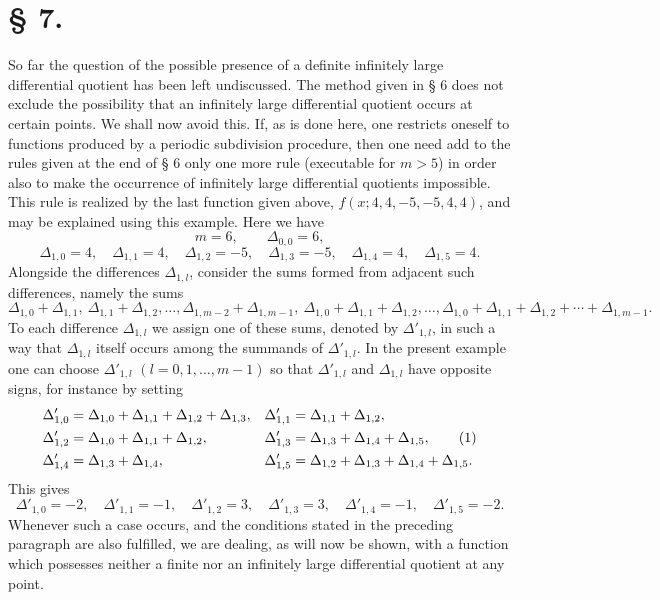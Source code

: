\documentclass[11pt,a4paper]{article}
\begin{document}
\section*{§ 7.}

So far the question of the possible presence of a definite infinitely large differential quotient has been left undiscussed. The method given in § 6 does not exclude the possibility that an infinitely large differential quotient occurs at certain points. We shall now avoid this. If, as is done here, one restricts oneself to functions produced by a periodic subdivision procedure, then one need add to the rules given at the end of § 6 only one more rule (executable for $m>5$) in order also to make the occurrence of infinitely large differential quotients impossible. This rule is realized by the last function given above, $f(x;4,4,-5,-5,4,4)$, and may be explained using this example. Here we have
\[
 m=6,
 \qquad
 \Delta_{0,0}=6,
\]
\[
 \Delta_{1,0}=4,\quad \Delta_{1,1}=4,
 \quad \Delta_{1,2}=-5,
 \quad \Delta_{1,3}=-5,
 \quad \Delta_{1,4}=4,
 \quad \Delta_{1,5}=4.
\]
Alongside the differences $\Delta_{1,l}$, consider the sums formed from adjacent such differences, namely the sums
\[
 \Delta_{1,0}+\Delta_{1,1},\ \Delta_{1,1}+\Delta_{1,2},\ldots,
 \Delta_{1,m-2}+\Delta_{1,m-1},\
 \Delta_{1,0}+\Delta_{1,1}+\Delta_{1,2},\ldots,
 \Delta_{1,0}+\Delta_{1,1}+\Delta_{1,2}+\cdots+\Delta_{1,m-1}.
\]
To each difference $\Delta_{1,l}$ we assign one of these sums, denoted by $\Delta'_{1,l}$, in such a way that $\Delta_{1,l}$ itself occurs among the summands of $\Delta'_{1,l}$. In the present example one can choose $\Delta'_{1,l}$ $(l=0,1,\ldots,m-1)$ so that $\Delta'_{1,l}$ and $\Delta_{1,l}$ have opposite signs, for instance by setting
\begin{align}
 \Delta'_{1,0}&=\Delta_{1,0}+\Delta_{1,1}+\Delta_{1,2}+\Delta_{1,3},
 &\Delta'_{1,1}&=\Delta_{1,1}+\Delta_{1,2},\notag\\
 \Delta'_{1,2}&=\Delta_{1,0}+\Delta_{1,1}+\Delta_{1,2},
 &\Delta'_{1,3}&=\Delta_{1,3}+\Delta_{1,4}+\Delta_{1,5},\tag{1}\\
 \Delta'_{1,4}&=\Delta_{1,3}+\Delta_{1,4},
 &\Delta'_{1,5}&=\Delta_{1,2}+\Delta_{1,3}+\Delta_{1,4}+\Delta_{1,5}.
\notag
\end{align}
This gives
\[
 \Delta'_{1,0}=-2,
 \quad \Delta'_{1,1}=-1,
 \quad \Delta'_{1,2}=3,
 \quad \Delta'_{1,3}=3,
 \quad \Delta'_{1,4}=-1,
 \quad \Delta'_{1,5}=-2.
\]
Whenever such a case occurs, and the conditions stated in the preceding paragraph are also fulfilled, we are dealing, as will now be shown, with a function which possesses neither a finite nor an infinitely large differential quotient at any point.
\end{document}
